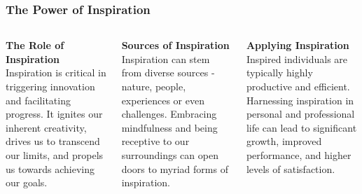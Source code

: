 \documentclass[5pt]{beamer}
\begin{document}
\begin{frame}
\frametitle{The Power of Inspiration}
\begin{columns}
\begin{column}{0.3\textwidth}
\begin{block}{\textbf{The Role of Inspiration}}
Inspiration is critical in triggering innovation and facilitating progress. It ignites our inherent creativity, drives us to transcend our limits, and propels us towards achieving our goals.
\end{block}
\end{column}
\begin{column}{0.3\textwidth}
\begin{block}{\textbf{Sources of Inspiration}}
Inspiration can stem from diverse sources - nature, people, experiences or even challenges. Embracing mindfulness and being receptive to our surroundings can open doors to myriad forms of inspiration.
\end{block}
\end{column}
\begin{column}{0.3\textwidth}
\begin{block}{\textbf{Applying Inspiration}}
Inspired individuals are typically highly productive and efficient. Harnessing inspiration in personal and professional life can lead to significant growth, improved performance, and higher levels of satisfaction.
\end{block}
\end{column}
\end{columns}
\end{frame}
\end{document}
